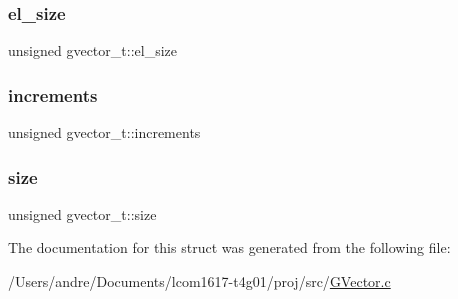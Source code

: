 \hypertarget{structgvector__t_a535f3426a6ac2dd946d90353674ec8c8}{}\label{structgvector__t_a535f3426a6ac2dd946d90353674ec8c8} 
\subsubsection{\texorpdfstring{el\+\_\+size}{el\_size}}
{\footnotesize\ttfamily unsigned gvector\+\_\+t\+::el\+\_\+size}

\hypertarget{structgvector__t_a39ed5cd080d8b5557cd6967c0aae966b}{}\label{structgvector__t_a39ed5cd080d8b5557cd6967c0aae966b} 
\subsubsection{\texorpdfstring{increments}{increments}}
{\footnotesize\ttfamily unsigned gvector\+\_\+t\+::increments}

\hypertarget{structgvector__t_a740303b1753b7d95a89c75637c875ca4}{}\label{structgvector__t_a740303b1753b7d95a89c75637c875ca4} 
\subsubsection{\texorpdfstring{size}{size}}
{\footnotesize\ttfamily unsigned gvector\+\_\+t\+::size}



The documentation for this struct was generated from the following file\+:\begin{DoxyCompactItemize}
\item 
/\+Users/andre/\+Documents/lcom1617-\/t4g01/proj/src/\hyperlink{_g_vector_8c}{G\+Vector.\+c}\end{DoxyCompactItemize}

